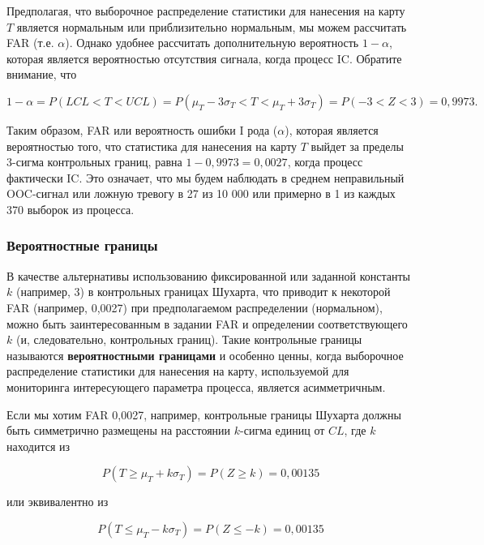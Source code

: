 Предполагая, что выборочное распределение статистики для нанесения на карту \(T\) является нормальным или приблизительно нормальным, мы можем рассчитать FAR (т.е. \(\alpha\)). Однако удобнее рассчитать дополнительную вероятность \(1 - \alpha\), которая является вероятностью отсутствия сигнала, когда процесс IC. Обратите внимание, что

\[
1 - \alpha = P(LCL < T < UCL) = P(\mu_T - 3\sigma_T < T < \mu_T + 3\sigma_T) = P(-3 < Z < 3) = 0,9973.
\]

Таким образом, FAR или вероятность ошибки I рода (\(\alpha\)), которая является вероятностью того, что статистика для нанесения на карту \(T\) выйдет за пределы 3-сигма контрольных границ, равна \(1 - 0,9973 = 0,0027\), когда процесс фактически IC. Это означает, что мы будем наблюдать в среднем неправильный OOC-сигнал или ложную тревогу в 27 из 10 000 или примерно в 1 из каждых 370 выборок из процесса.

\subsubsection{Вероятностные границы}

В качестве альтернативы использованию фиксированной или заданной константы \(k\) (например, 3) в контрольных границах Шухарта, что приводит к некоторой FAR (например, 0,0027) при предполагаемом распределении (нормальном), можно быть заинтересованным в задании FAR и определении соответствующего \(k\) (и, следовательно, контрольных границ). Такие контрольные границы называются \textbf{вероятностными границами} и особенно ценны, когда выборочное распределение статистики для нанесения на карту, используемой для мониторинга интересующего параметра процесса, является асимметричным.

Если мы хотим FAR 0,0027, например, контрольные границы Шухарта должны быть симметрично размещены на расстоянии \(k\)-сигма единиц от \(CL\), где \(k\) находится из

\[
P(T \geq \mu_T + k\sigma_T) = P(Z \geq k) = 0,00135
\]

или эквивалентно из

\[
P(T \leq \mu_T - k\sigma_T) = P(Z \leq -k) = 0,00135
\]

